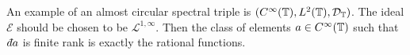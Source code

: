 %    
%    
    


\begin{example}
    An example of an almost circular spectral triple is $(C^\infty(\mathbb{T}),L^2(\mathbb{T}),\mathcal{D}_{\mathbb{T}})$.
    The ideal $\mathcal{E}$ should be chosen to be $\mathcal{L}^{1,\infty}$. Then
    the class of elements $a \in C^\infty(\mathbb{T})$ such that $\qd a$ is finite
    rank is exactly the rational functions. 
\end{example}

